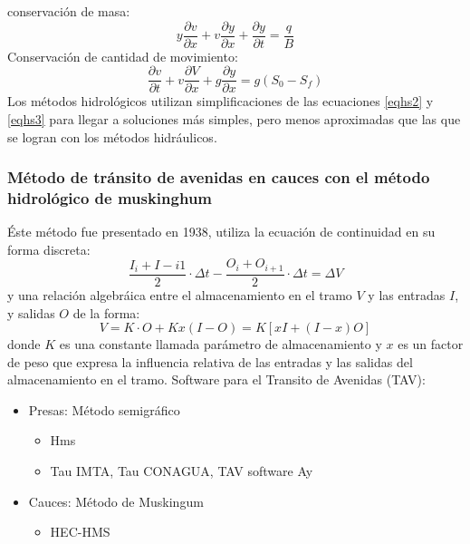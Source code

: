 conservación de masa:
\begin{equation}
    y \frac{\partial v}{\partial x} + v \frac{\partial y}{\partial x} + \frac{\partial y}{\partial t} = \frac{q}{B}
    \label{eqhs2}
\end{equation}
Conservación de cantidad de movimiento:
\begin{equation}
    \frac{\partial v}{\partial t} + v\frac{\partial V}{\partial x} + g \frac{\partial y}{\partial x} = g\left(S_0 - S_f\right)
    \label{eqhs3}
\end{equation}
Los métodos hidrológicos utilizan simplificaciones de las ecuaciones \eqref{eqhs2} y \eqref{eqhs3} para llegar a soluciones más simples, pero menos aproximadas que las que se logran con los métodos hidráulicos. 
\subsubsection{Método de tránsito de avenidas en cauces con el método hidrológico de muskinghum}
Éste método fue presentado en 1938, utiliza la ecuación de continuidad en su forma discreta:
\begin{equation}
    \frac{I_i + I -{i 1}}{2}\cdot \Delta t -\frac{O_i + O_{i +1}}{2}\cdot\Delta t =\Delta V
\end{equation}
y una relación algebráica entre el almacenamiento en el tramo $V$ y las entradas $I$, y salidas $O$ de la forma:
\begin{equation}
    V = K\cdot O + Kx(I - O) = K\left[ xI +(I - x)O\right]
\end{equation}
donde $K$ es una constante llamada parámetro de almacenamiento y $x$ es un factor de peso que expresa la influencia relativa de las entradas y las salidas del almacenamiento en el tramo.
Software para el Transito de Avenidas (TAV):
\begin{itemize}
    \item Presas: Método semigráfico \begin{itemize}
        \item Hms
        \item Tau IMTA, Tau CONAGUA, TAV software Ay
    \end{itemize}
    \item Cauces: Método de Muskingum \begin{itemize}
        \item HEC-HMS
    \end{itemize}
\end{itemize}

